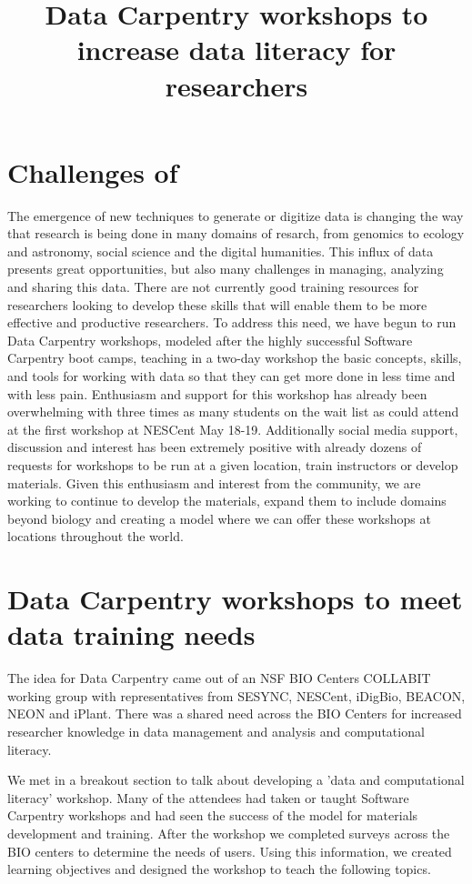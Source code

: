 \documentclass[11pt]{article}
\begin{document}
\title{Data Carpentry workshops to increase data literacy for researchers}
\maketitle

\section{Challenges of }
The emergence of new techniques to generate or digitize data is changing the way that research is being done in many domains of resarch, from genomics to ecology and astronomy, social science and the digital humanities. This influx of data presents great opportunities, but also many challenges in managing, analyzing and sharing this data. There are not currently good training resources for researchers looking to develop these skills that will enable them to be more effective and productive researchers. To address this need, we have begun to run Data Carpentry workshops, modeled after the highly successful Software Carpentry boot camps, teaching in a  two-day workshop the basic concepts, skills, and tools for working with data so that they can get more done in less time and with less pain. Enthusiasm and support for this workshop has already been overwhelming with three times as many students on the wait list as could attend at the first workshop at NESCent May 18-19. Additionally social media support, discussion and interest has been extremely positive with already dozens of requests for workshops to be run at a given location, train instructors or develop materials. Given this enthusiasm and interest from the community, we are working to continue to develop the materials, expand them to include domains beyond biology and creating a model where we can offer these workshops at locations throughout the world.


\section{Data Carpentry workshops to meet data training needs}

The idea for Data Carpentry came out of an NSF BIO Centers COLLABIT working group with 
representatives from SESYNC, NESCent, iDigBio, BEACON, NEON and iPlant. There was a shared 
need across the BIO Centers for increased researcher knowledge in data management and 
analysis and computational literacy. 

We met in a breakout section to talk about developing a 'data and computational literacy'
workshop. Many of the attendees had taken or taught Software Carpentry workshops and
had seen the success of the model for materials development and training. After the workshop we completed 
surveys across the BIO centers to determine the needs of users. Using this information, we created learning objectives and designed the workshop to teach the following topics.
\end{document}
